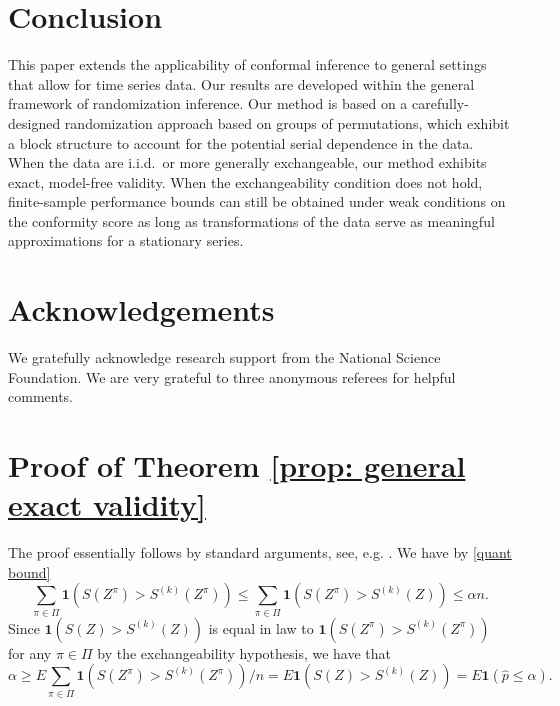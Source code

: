 \documentclass[final,12pt]{colt2018} %
\newcommand{\yinchu}[1]{\textcolor{teal}{Yinchu: #1}}
\begin{document}







\section{Conclusion}
\label{sec: conclusion}
This paper extends the applicability of conformal inference to general settings that allow for time series data. Our results are developed within the general framework of randomization inference. Our method is based on a carefully-designed randomization approach based on groups of permutations, which exhibit a block structure to account for the potential serial dependence in the data. When the data are i.i.d.\ or more generally exchangeable, our method exhibits exact, model-free validity. When the exchangeability condition does not hold, finite-sample performance bounds can still be obtained under weak conditions on the conformity score as long as transformations of the data serve as meaningful approximations for a stationary series. 

\section*{Acknowledgements}
We gratefully acknowledge research support from the National Science Foundation. We are very grateful to three anonymous referees for helpful comments.








\newpage
\appendix


\section{Proof of Theorem \ref{prop: general exact validity}} The proof essentially follows by
standard arguments, see, e.g.   \cite{romano1990behavior}. We have by \eqref{quant bound}
$$
\sum_{\pi \in \Pi} \mathbf{1}( S(Z^\pi ) > S^{(k)}(Z^\pi) ) \leq \sum_{\pi \in \Pi} \mathbf{1}( S(Z^\pi ) > S^{(k)}(Z)) \leq \alpha n.
$$
Since $\mathbf{1}( S(Z) > S^{(k)}(Z) )$ is equal in law to  $\mathbf{1}( S(Z^\pi) > S^{(k)}(Z^\pi) )$  for any $\pi \in \Pi$ by the exchangeability hypothesis, we have that
$$
\alpha \geq E \sum_{\pi \in \Pi} \mathbf{1}( S(Z^\pi) > S^{(k)}(Z^\pi) )/n = E  \mathbf{1}( S(Z) > S^{(k)}(Z) ) = E \mathbf{1} (\hat p \leq \alpha).
$$
\end{document}
